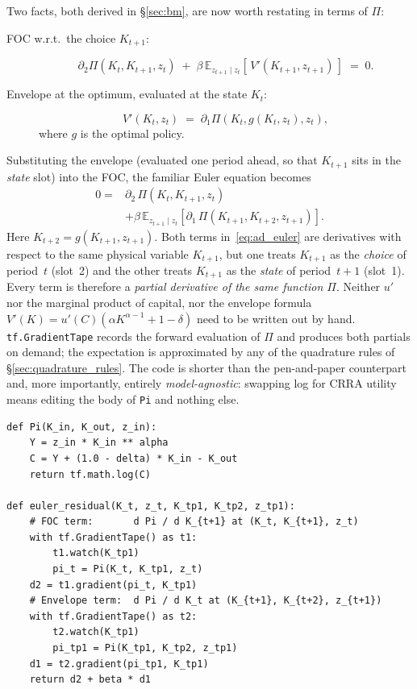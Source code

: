 \documentclass[11pt,a4paper]{report}
\begin{document}
Two facts, both derived in \S\ref{sec:bm}, are now worth restating in terms of $\Pi$:
\begin{description}
\item[FOC w.r.t.\ the choice $K_{t+1}$:]
\[
\partial_2 \Pi(K_t,K_{t+1},z_t)
\;+\;
\beta\,\mathbb{E}_{z_{t+1}\mid z_t}[\,V'(K_{t+1},z_{t+1})\,]
\;=\;0.
\]
\item[Envelope at the optimum, evaluated at the state $K_t$:]
\[
V'(K_t, z_t)
\;=\;
\partial_1 \Pi(K_t, g(K_t, z_t), z_t),
\]
where $g$ is the optimal policy.
\end{description}
Substituting the envelope (evaluated one period ahead, so that $K_{t+1}$ sits in the \emph{state} slot) into the FOC, the familiar Euler equation becomes
\begin{equation}
\boxed{
\begin{aligned}
0
= {}& \partial_2\,\Pi(K_t, K_{t+1}, z_t)\\
&+ \beta\,\mathbb{E}_{z_{t+1}\mid z_t}\!\left[
\partial_1\,\Pi(K_{t+1}, K_{t+2}, z_{t+1})
\right].
\end{aligned}}
\label{eq:ad_euler}
\end{equation}
Here $K_{t+2}=g(K_{t+1},z_{t+1})$.  Both terms in~\eqref{eq:ad_euler} are derivatives with respect to the same physical variable $K_{t+1}$, but one treats $K_{t+1}$ as the \emph{choice} of period~$t$ (slot~2) and the other treats $K_{t+1}$ as the \emph{state} of period~$t+1$ (slot~1).  Every term is therefore a \emph{partial derivative of the same function $\Pi$}.  Neither $u'$ nor the marginal product of capital, nor the envelope formula $V'(K) = u'(C)(\alpha K^{\alpha-1} + 1 - \delta)$ need to be written out by hand.  \texttt{tf.GradientTape} records the forward evaluation of $\Pi$ and produces both partials on demand; the expectation is approximated by any of the quadrature rules of \S\ref{sec:quadrature_rules}.  The code is shorter than the pen-and-paper counterpart and, more importantly, entirely \emph{model-agnostic}: swapping log for CRRA utility means editing the body of \texttt{Pi} and nothing else.

\begin{lstlisting}[caption={Autodiff Euler residual for Brock--Mirman.  The function \texttt{Pi} is the only model-specific code; the rest is generic.  A full implementation appears in \texttt{lectures/day4/code/02\_Brock\_Mirman\_AutoDiff\_DEQN.ipynb}.}, label=lst:autodiff_euler]
def Pi(K_in, K_out, z_in):
    Y = z_in * K_in ** alpha
    C = Y + (1.0 - delta) * K_in - K_out
    return tf.math.log(C)

def euler_residual(K_t, z_t, K_tp1, K_tp2, z_tp1):
    # FOC term:       d Pi / d K_{t+1} at (K_t, K_{t+1}, z_t)
    with tf.GradientTape() as t1:
        t1.watch(K_tp1)
        pi_t = Pi(K_t, K_tp1, z_t)
    d2 = t1.gradient(pi_t, K_tp1)
    # Envelope term:  d Pi / d K_t at (K_{t+1}, K_{t+2}, z_{t+1})
    with tf.GradientTape() as t2:
        t2.watch(K_tp1)
        pi_tp1 = Pi(K_tp1, K_tp2, z_tp1)
    d1 = t2.gradient(pi_tp1, K_tp1)
    return d2 + beta * d1
\end{lstlisting}
\end{document}
